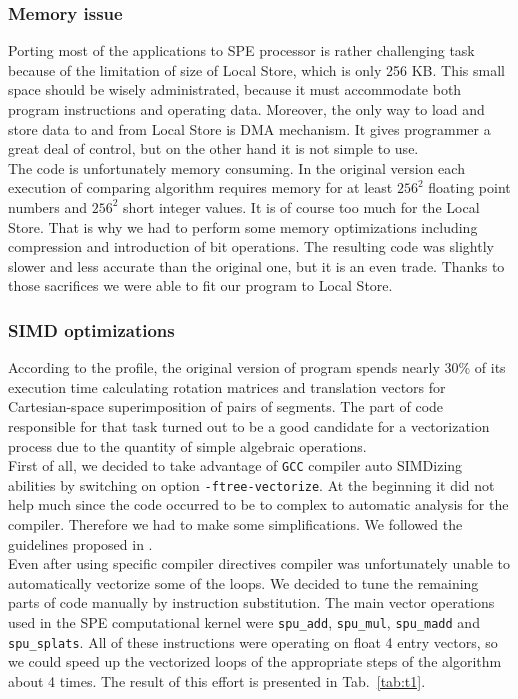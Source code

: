 \subsubsection{Memory issue}
Porting most of the applications to SPE processor is rather challenging task
because of the limitation of size of Local Store, which is only 256 KB.
This small space should be wisely administrated, because it must accommodate
both program instructions and operating data.
Moreover, the only way to load and store data to and from Local Store is DMA
mechanism.
It gives programmer a great deal of control, but on the other hand it is not
simple to use.\\
The \prog{} code is unfortunately memory consuming.
In the original version each execution of comparing algorithm requires memory
for at least $256^2$ floating point numbers and $256^2$ short integer values.
It is of course too much for the Local Store.
That is why we had to perform some memory optimizations including compression
and introduction of bit operations.
The resulting code was slightly slower and less accurate than the original one,
but it is an even trade.
Thanks to those sacrifices we were able to fit our program to Local Store.

\subsubsection{SIMD optimizations}
According to the profile, the original version of \prog{} program spends nearly
$30\%$ of its execution time calculating rotation matrices and translation
vectors for Cartesian-space superimposition of pairs of segments.
The part of code responsible for that task turned out to be a good candidate for
a vectorization process due to the quantity of simple algebraic operations.\\
First of all, we decided to take advantage of \texttt{GCC} compiler auto
SIMDizing abilities by switching on option \texttt{-ftree-vectorize}.
At the beginning it did not help much since the code occurred to be to complex
to automatic analysis for the compiler.
Therefore we had to make some simplifications.
We followed the guidelines proposed in \cite{rb}. \\
Even after using specific compiler directives compiler was unfortunately unable
to automatically vectorize some of the loops.
We decided to tune the remaining parts of code manually by instruction
substitution.
The main vector operations used in the SPE computational kernel were
\texttt{spu\_add}, \texttt{spu\_mul}, \texttt{spu\_madd} and
\texttt{spu\_splats}.
All of these instructions were operating on float 4 entry vectors, so we could
speed up the vectorized loops of the appropriate steps of the algorithm about
4 times.
The result of this effort is presented in Tab.~\ref{tab:t1}.

